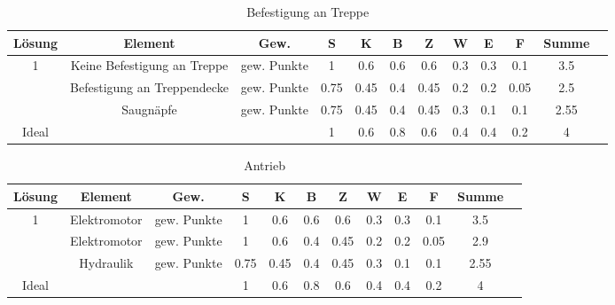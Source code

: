 \documentclass[10pt,a4paper]{article}
\begin{document}
\begin{table}[h!]
    \centering
    \begin{tabular}{cccccccccccc}
        \toprule
        \textbf{Lösung} & \textbf{Element}            & \textbf{Gew.} & \textbf{S} & \textbf{K} & \textbf{B} & \textbf{Z} & \textbf{W} & \textbf{E} & \textbf{F} & \textbf{Summe} & \\
        \midrule
        1               & Keine Befestigung an Treppe & gew. Punkte   & 1          & 0.6        & 0.6        & 0.6        & 0.3        & 0.3        & 0.1        & 3.5              \\
        \addlinespace
        2               & Befestigung an Treppendecke & gew. Punkte   & 0.75       & 0.45       & 0.4        & 0.45       & 0.2        & 0.2        & 0.05       & 2.5              \\
        \addlinespace
        3               & Saugnäpfe                   & gew. Punkte   & 0.75       & 0.45       & 0.4        & 0.45       & 0.3        & 0.1        & 0.1        & 2.55             \\
        \midrule
        Ideal           &                             &               & 1          & 0.6        & 0.8        & 0.6        & 0.4        & 0.4        & 0.2        & 4                \\
        \bottomrule
    \end{tabular}
    \caption{Befestigung an Treppe}
    \label{tab:befestigung_treppe}
\end{table}
\begin{table}[h!]
    \centering
    \begin{tabular}{cccccccccccc}
        \toprule
        \textbf{Lösung} & \textbf{Element} & \textbf{Gew.} & \textbf{S} & \textbf{K} & \textbf{B} & \textbf{Z} & \textbf{W} & \textbf{E} & \textbf{F} & \textbf{Summe} & \\
        \midrule
        1               & Elektromotor     & gew. Punkte   & 1          & 0.6        & 0.6        & 0.6        & 0.3        & 0.3        & 0.1        & 3.5              \\
        \addlinespace
        2               & Elektromotor     & gew. Punkte   & 1          & 0.6        & 0.4        & 0.45       & 0.2        & 0.2        & 0.05       & 2.9              \\
        \addlinespace
        3               & Hydraulik        & gew. Punkte   & 0.75       & 0.45       & 0.4        & 0.45       & 0.3        & 0.1        & 0.1        & 2.55             \\
        \midrule
        Ideal           &                  &               & 1          & 0.6        & 0.8        & 0.6        & 0.4        & 0.4        & 0.2        & 4                \\
        \bottomrule
    \end{tabular}
    \caption{Antrieb}
    \label{tab:antrieb}
\end{table}
\end{document}
